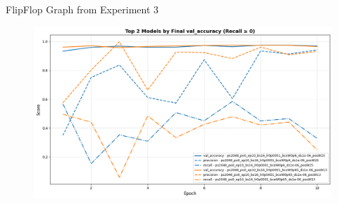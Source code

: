 \documentclass{beamer}
\begin{document}
\begin{frame}{FlipFlop Graph from Experiment 3}
    \begin{figure}
        \centering
        \includegraphics[height=0.7\textheight]{Images/Exp3_acc_prec_rec.png}
    \end{figure}
\end{frame}
\end{document}
